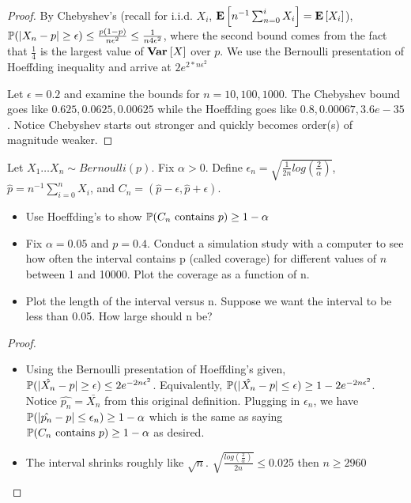 \documentclass[10pt]{article}
\begin{document}
\begin{proof}
    By Chebyshev's (recall for i.i.d. $X_i$, $\E{n^{-1}\sum_{n=0}^{i} X_i} =
    \E{X_i}$), $\P(|X_n - p| \geq \epsilon) \leq \frac{p(1-p)}{n\epsilon^2} \leq
    \frac{1}{n4\epsilon^2}$, where the second bound comes from the fact that
    $\frac{1}{4}$ is the largest value of $\Var{X}$ over $p$. We use the
    Bernoulli presentation of Hoeffding inequality and arrive at $2e^{2*n\epsilon^2}$

    Let $\epsilon=0.2$ and examine the bounds for $n=10, 100, 1000$. The
    Chebyshev bound goes like $0.625, 0.0625, 0.00625$ while the Hoeffding goes
    like $0.8, 0.00067, 3.6e-35$. Notice Chebyshev starts out stronger and
    quickly becomes order(s) of magnitude weaker.
\end{proof}

\begin{exercise}
    Let $X_1 \dots X_n \sim Bernoulli(p)$. Fix $\alpha > 0$. Define
    $\epsilon_n = \sqrt{\frac{1}{2n}log(\frac{2}{\alpha})}$, $\hat{p} = n^{-1}
    \sum_{i=0}^n X_i$, and $C_n = (\hat{p}-\epsilon, \hat{p}+\epsilon)$.
    \begin{itemize}
        \item{Use Hoeffding's to show $\P(C_n \text{ contains } p) \geq 1 -
            \alpha$}
        \item{Fix $\alpha=0.05$ and $p=0.4$. Conduct a simulation study with a
            computer to see how often the interval contains p (called coverage) for different
        values of $n$ between 1 and 10000. Plot the coverage as a function of
    n.}
        \item{Plot the length of the interval versus n. Suppose we want the
            interval to be less than 0.05. How large should n be?}
    \end{itemize}
\end{exercise}

\begin{proof}
    \begin{itemize}
        \item{Using the Bernoulli presentation of Hoeffding's given,
            $\P(|\hat{X_n} - p| \geq \epsilon) \leq 2e^{-2n\epsilon^2}$.
        Equivalently, $\P(|\hat{X_n} - p| \leq \epsilon) \geq 1 -
        2e^{-2n\epsilon^2}$. Notice $\hat{p_n} = \bar{X_n}$ from this original
        definition. Plugging in $\epsilon_n$, we have $\P(|\hat{p_n} - p| \leq
        \epsilon_n) \geq 1 - \alpha$ which is the same as saying $\P(C_n
    \text{ contains } p) \geq 1 - \alpha$ as desired.}
    \item{The interval shrinks roughly like $\sqrt{n}$.
        $\sqrt{\frac{log(\frac{2}{\alpha})}{2n}} \leq 0.025$ then $n \geq 2960$}
    \end{itemize}
\end{proof}
\end{document}
